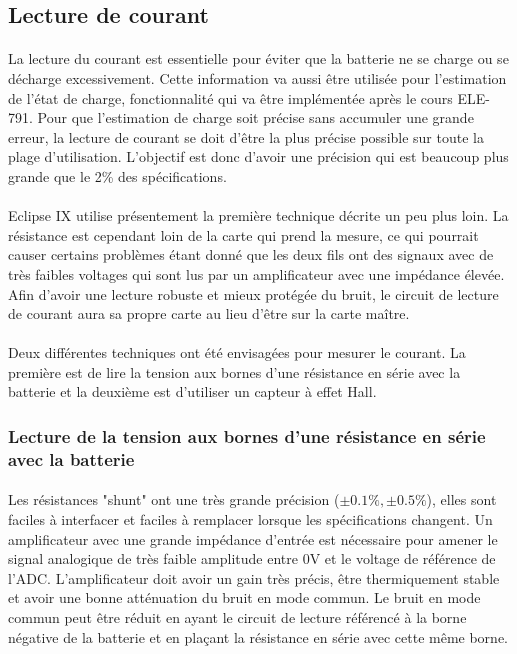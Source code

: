 \subsection{Lecture de courant}
	\paragraph*{}
	La lecture du courant est essentielle pour éviter que la batterie ne se charge ou se décharge excessivement. Cette information va aussi être utilisée pour l'estimation de l'état de charge, fonctionnalité qui va être implémentée après le cours ELE-791. Pour que l'estimation de charge soit précise sans accumuler une grande erreur, la lecture de courant se doit d'être la plus précise possible sur toute la plage d'utilisation. L'objectif est donc d'avoir une précision qui est beaucoup plus grande que le 2\% des spécifications.

	\paragraph*{}
	Eclipse IX utilise présentement la première technique décrite un peu plus loin. La résistance est cependant loin de la carte qui prend la mesure, ce qui pourrait causer certains problèmes étant donné que les deux fils ont des signaux avec de très faibles voltages qui sont lus par un amplificateur avec une impédance élevée. Afin d'avoir une lecture robuste et mieux protégée du bruit, le circuit de lecture de courant aura sa propre carte au lieu d'être sur la carte maître.

	\paragraph*{}
	Deux différentes techniques ont été envisagées pour mesurer le courant. La première est de lire la tension aux bornes d'une résistance en série avec la batterie et la deuxième est d'utiliser un capteur à effet Hall.


	\subsubsection*{Lecture de la tension aux bornes d'une résistance en série avec la batterie}
	\paragraph*{}
	Les résistances "shunt" ont une très grande précision ($\pm 0.1 \% , \pm 0.5 \%$), elles sont faciles à interfacer et faciles à remplacer lorsque les spécifications changent. Un amplificateur avec une grande impédance d'entrée est nécessaire pour amener le signal analogique de très faible amplitude entre 0V et le voltage de référence de l'ADC. L'amplificateur doit avoir un gain très précis, être thermiquement stable et avoir une bonne atténuation du bruit en mode commun. Le bruit en mode commun peut être réduit en ayant le circuit de lecture référencé à la borne négative de la batterie et en plaçant la résistance en série avec cette même borne.


